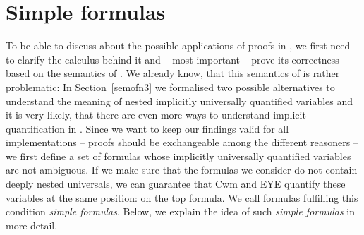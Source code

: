 \section{Simple formulas}
To be able to discuss about the possible applications of proofs in \nthree, we first need to 
clarify the calculus behind it and -- most important -- prove its correctness based on the semantics of \nthree. We already know, 
that this semantics of \nthree is 
rather problematic: In Section~\ref{semofn3} we formalised two possible alternatives to understand the meaning of nested implicitly universally quantified variables
and it is very likely, that there are even more ways to understand implicit quantification in \nthree. 
% 
Since we want to keep our findings valid for all implementations -- proofs should 
be exchangeable among the different reasoners -- we 
first define a set of formulas whose implicitly universally
quantified variables are not ambiguous.  If we make sure that the formulas we consider do not contain deeply nested universals, we can guarantee that Cwm and EYE 
quantify these variables at the same position: on the top formula.
We call formulas fulfilling this condition \emph{simple formulas}. Below, we explain the idea of such \emph{simple formulas} in more detail.


